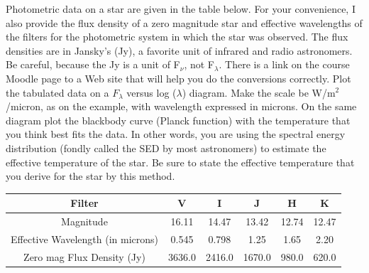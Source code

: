 \documentclass[12pt]{article}
\newenvironment{problem}[2][Problem]{\begin{trivlist}
\item[\hskip \labelsep {\bfseries #1}\hskip \labelsep {\bfseries #2.}]}{\end{trivlist}}
\begin{document}
\bigskip
\bigskip






\begin{problem}{3}
Photometric data on a star are given in the table below. For your convenience, I also provide the flux density of a zero magnitude star and effective wavelengths of the filters for the photometric system in which the star was observed. The flux densities are in Jansky's (Jy), a favorite unit of infrared and radio astronomers. Be careful, because the Jy is a unit of F$_\nu$, not F$_\lambda$. There is a link on the course Moodle page to a Web site that will help you do the conversions correctly. Plot the tabulated data on a $F_\lambda$ versus log ($\lambda$) diagram. Make the scale be W/m$^2$/micron, as on the example, with wavelength expressed in microns. On the same diagram plot the blackbody curve (Planck function) with the temperature that you think best fits the data. In other words, you are using the spectral energy distribution (fondly called the SED by most astronomers) to estimate the effective temperature of the star. Be sure to state the effective temperature that you derive for the star by this method.
\bigskip
\smallskip

\begin{tabular} {cccccc}

Filter & V & I & J & H & K \\
\hline
\hline
Magnitude & 16.11 & 14.47 & 13.42 & 12.74 & 12.47 \\
Effective Wavelength (in microns) & 0.545 & 0.798 & 1.25 & 1.65 & 2.20 \\
Zero mag Flux Density (Jy) & 3636.0 & 2416.0 & 1670.0 & 980.0 & 620.0 \\
\hline

\end{tabular}

\end{problem}
\end{document}
